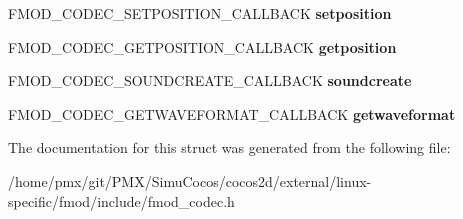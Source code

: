 \begin{DoxyCompactItemize}
F\+M\+O\+D\+\_\+\+C\+O\+D\+E\+C\+\_\+\+S\+E\+T\+P\+O\+S\+I\+T\+I\+O\+N\+\_\+\+C\+A\+L\+L\+B\+A\+CK {\bfseries setposition}
\item 
\mbox{\label{structFMOD__CODEC__DESCRIPTION_aca4b4ae61caf677c7a6fbaed48e024ac}} 
F\+M\+O\+D\+\_\+\+C\+O\+D\+E\+C\+\_\+\+G\+E\+T\+P\+O\+S\+I\+T\+I\+O\+N\+\_\+\+C\+A\+L\+L\+B\+A\+CK {\bfseries getposition}
\item 
\mbox{\label{structFMOD__CODEC__DESCRIPTION_aec9ca5133371b75986e6fbcbf0b017fc}} 
F\+M\+O\+D\+\_\+\+C\+O\+D\+E\+C\+\_\+\+S\+O\+U\+N\+D\+C\+R\+E\+A\+T\+E\+\_\+\+C\+A\+L\+L\+B\+A\+CK {\bfseries soundcreate}
\item 
\mbox{\label{structFMOD__CODEC__DESCRIPTION_ac0c601819e7806447a718b0d595e1189}} 
F\+M\+O\+D\+\_\+\+C\+O\+D\+E\+C\+\_\+\+G\+E\+T\+W\+A\+V\+E\+F\+O\+R\+M\+A\+T\+\_\+\+C\+A\+L\+L\+B\+A\+CK {\bfseries getwaveformat}
\end{DoxyCompactItemize}


The documentation for this struct was generated from the following file\+:\begin{DoxyCompactItemize}
\item 
/home/pmx/git/\+P\+M\+X/\+Simu\+Cocos/cocos2d/external/linux-\/specific/fmod/include/fmod\+\_\+codec.\+h\end{DoxyCompactItemize}

